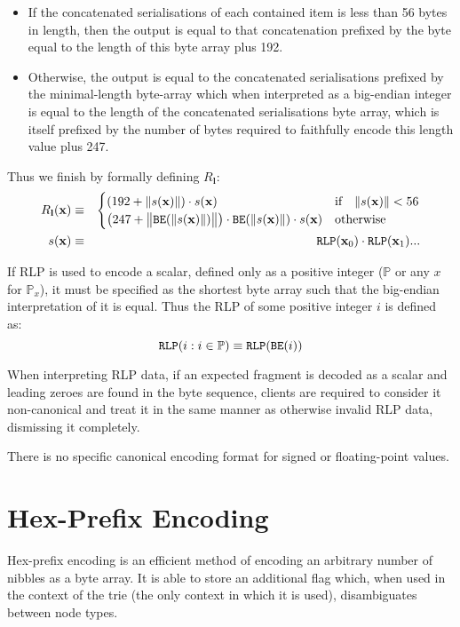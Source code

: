 \documentclass[9pt,oneside]{amsart}
\begin{document}
\begin{itemize}
\item If the concatenated serialisations of each contained item is less than 56 bytes in length, then the output is equal to that concatenation prefixed by the byte equal to the length of this byte array plus 192.
\item Otherwise, the output is equal to the concatenated serialisations prefixed by the minimal-length byte-array which when interpreted as a big-endian integer is equal to the length of the concatenated serialisations byte array, which is itself prefixed by the number of bytes required to faithfully encode this length value plus 247.
\end{itemize}
\hypertarget{R l}{
Thus we finish by formally defining $R_\mathbf{l}$:
\begin{eqnarray}
R_\mathbf{l}(\mathbf{x}) & \equiv & \begin{cases}
(192 + \lVert s(\mathbf{x}) \rVert) \cdot s(\mathbf{x}) & \text{if} \quad \lVert s(\mathbf{x}) \rVert < 56 \\
\big(247 + \big\lVert \mathtt{\tiny BE}(\lVert s(\mathbf{x}) \rVert) \big\rVert \big) \cdot \mathtt{\tiny BE}(\lVert s(\mathbf{x}) \rVert) \cdot s(\mathbf{x}) & \text{otherwise}
\end{cases} \\
s(\mathbf{x}) & \equiv & \mathtt{\tiny RLP}(\mathbf{x}_0) \cdot \mathtt{\tiny RLP}(\mathbf{x}_1) ...
\end{eqnarray}
}
If RLP is used to encode a scalar, defined only as a positive integer ($\mathbb{P}$ or any $x$ for $\mathbb{P}_x$), it must be specified as the shortest byte array such that the big-endian interpretation of it is equal. Thus the RLP of some positive integer $i$ is defined as:
\begin{equation}
\mathtt{\tiny RLP}(i : i \in \mathbb{P}) \equiv \mathtt{\tiny RLP}(\mathtt{\tiny BE}(i))
\end{equation}

When interpreting RLP data, if an expected fragment is decoded as a scalar and leading zeroes are found in the byte sequence, clients are required to consider it non-canonical and treat it in the same manner as otherwise invalid RLP data, dismissing it completely.

There is no specific canonical encoding format for signed or floating-point values.

\section{Hex-Prefix Encoding}\label{app:hexprefix}
Hex-prefix encoding is an efficient method of encoding an arbitrary number of nibbles as a byte array. It is able to store an additional flag which, when used in the context of the trie (the only context in which it is used), disambiguates between node types.
\end{document}
